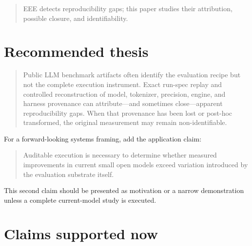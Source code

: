 \documentclass[11pt,oneside]{report}
\begin{document}
\begin{quote}
EEE detects reproducibility gaps; this paper studies their attribution, possible closure, and identifiability.
\end{quote}

\section{Recommended thesis}

\begin{quote}
Public LLM benchmark artifacts often identify the evaluation recipe but not the complete execution instrument. Exact run-spec replay and controlled reconstruction of model, tokenizer, precision, engine, and harness provenance can attribute---and sometimes close---apparent reproducibility gaps. When that provenance has been lost or post-hoc transformed, the original measurement may remain non-identifiable.
\end{quote}

For a forward-looking systems framing, add the application claim:

\begin{quote}
Auditable execution is necessary to determine whether measured improvements in current small open models exceed variation introduced by the evaluation substrate itself.
\end{quote}

This second claim should be presented as motivation or a narrow demonstration unless a complete current-model study is executed.

\section{Claims supported now}
\end{document}
